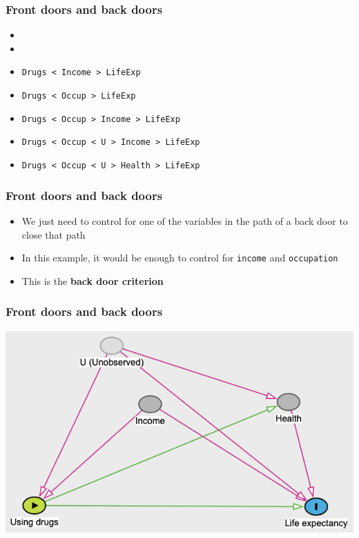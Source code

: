 \documentclass[aspectratio=43]{beamer}
\begin{document}
\begin{frame}
\frametitle{Front doors and back doors}
\centering

\begin{itemize}
  \item {}
  \item {}
  \item \texttt{Drugs < Income > LifeExp}
  \item \texttt{Drugs < Occup > LifeExp}
  \item \texttt{Drugs < Occup > Income > LifeExp}
  \item \texttt{Drugs < Occup < U > Income > LifeExp}
  \item \texttt{Drugs < Occup < U > Health > LifeExp}
\end{itemize}

\end{frame}

\begin{frame}
\frametitle{Front doors and back doors}
\centering

\begin{itemize}
  \item We just need to control for one of the variables in the path of a back door to close that path
  \item In this example, it would be enough to control for \texttt{income} and \texttt{occupation}
  \item This is the \textbf{back door criterion}
\end{itemize}

\end{frame}


\begin{frame}
\frametitle{Front doors and back doors}
\centering

\includegraphics[width = \textwidth]{../img/drugs_dag2}

\end{frame}
\end{document}
